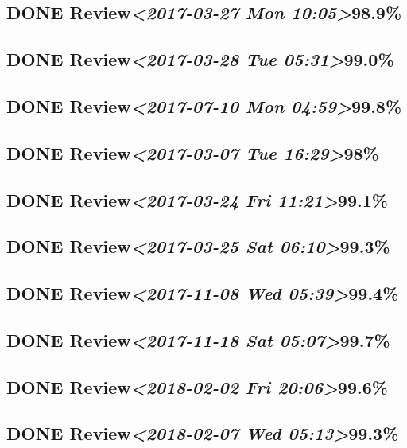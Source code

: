 \documentclass[11pt]{ctexart}
\begin{document}
\subsection{{\bfseries\sffamily DONE} Review\textit{<2017-03-27 Mon 10:05>}98.9\%}
\label{sec:org5045865}
\subsection{{\bfseries\sffamily DONE} Review\textit{<2017-03-28 Tue 05:31>}99.0\%}
\label{sec:orgf3439ff}
\subsection{{\bfseries\sffamily DONE} Review\textit{<2017-07-10 Mon 04:59>}99.8\%}
\label{sec:org3014fa5}
\subsection{{\bfseries\sffamily DONE} Review\textit{<2017-03-07 Tue 16:29>}98\%}
\label{sec:orgc0679fc}
\subsection{{\bfseries\sffamily DONE} Review\textit{<2017-03-24 Fri 11:21>}99.1\%}
\label{sec:org70f810f}
\subsection{{\bfseries\sffamily DONE} Review\textit{<2017-03-25 Sat 06:10>}99.3\%}
\label{sec:orge530da5}
\subsection{{\bfseries\sffamily DONE} Review\textit{<2017-11-08 Wed 05:39>}99.4\%}
\label{sec:org2880648}
\subsection{{\bfseries\sffamily DONE} Review\textit{<2017-11-18 Sat 05:07>}99.7\%}
\label{sec:orgb9388c5}
\subsection{{\bfseries\sffamily DONE} Review\textit{<2018-02-02 Fri 20:06>}99.6\%}
\label{sec:org37b6978}
\subsection{{\bfseries\sffamily DONE} Review\textit{<2018-02-07 Wed 05:13>}99.3\%}
\label{sec:orgb1e5627}
\end{document}
